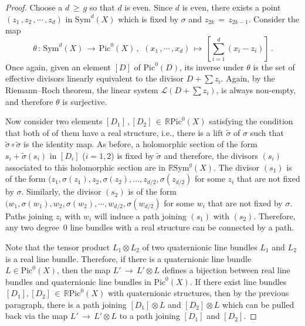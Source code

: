 \documentclass{article}
\theoremstyle{remark}
\begin{document}
\begin{proof}
  Choose a $d\,\geq\, g$ so that $d$ is even. Since $d$ is even, there exists a point
$(z_1\, ,z_2\, ,\cdots\, ,z_d)$
in $\mathrm{Sym}^d(X)$ which is fixed by $\sigma$ and $z_{2k}\,=\,z_{2k-1}$.  
   Consider the map 
   \[\theta\,:\, \mathrm{Sym}^d(X) \,\longrightarrow\, \mathrm{Pic}^0(X)
   \, ,\,\ (x_1\, ,\cdots\, ,x_d) \,\longmapsto\, [\displaystyle\sum_{i=1}^d (x_i-z_i)]\, .\]
Once again, given an element $[D]$ of  $\mathrm{Pic}^0(D)$, its inverse under $\theta$ is the set of effective divisors linearly equivalent to the divisor $D+\sum z_i$. Again, by the Riemann--Roch theorem, the linear system $\mathcal{L}(D+\sum z_i)$, is always non-empty, and therefore $\theta$ is surjective.

Now consider two elements $[D_1]\, ,[D_2]\,\in\, \mathbb{R}\mathrm{Pic}^0(X)$ satisfying
the condition that both of of them have a real structure, i.e., there is a lift
$\widetilde{\sigma}$ of 
$\sigma$ such that $\widetilde{\sigma} \circ\widetilde{\sigma}$ is the identity map. As 
before, a holomorphic section of the form $s_i+\widetilde{\sigma}(s_i)$ in $[D_i]$ 
($i=1,2$) is fixed by $\widetilde{\sigma}$ and therefore, the divisors $(s_i)$ 
associated to this holomorphic section are in $\mathbb{R}\mathrm{Sym}^{g}(X)$. The 
divisor $(s_1)$ is of the form $(z_1,\sigma(z_1),z_2,\sigma(z_2),\ldots 
,z_{d/2},\sigma(z_{d/2})$ for some $z_i$ that are not fixed by $\sigma$. Similarly, 
the divisor $(s_2)$ is of the form $(w_1,\sigma(w_1),w_2,\sigma(w_2),\cdots 
,w_{d/2},\sigma(w_{d/2})$ for some $w_i$ that are not fixed by $\sigma$. Paths 
joining $z_i$ with $w_i$ will induce a path joining $(s_1)$ with $(s_2)$. Therefore, 
any two degree~0 line bundles with a real structure can be connected by a path.

Note that the tensor product $L_1 \otimes L_2$ of two quaternionic line bundles 
$L_1$ and $L_2$ is a real line bundle. Therefore, if there is a quaternionic line 
bundle $L \in \mathrm{Pic}^0(X)$, then the map $L'\,\longrightarrow\, L'\otimes L$ defines a 
bijection between real line bundles and quaternionic line bundles in 
$\mathrm{Pic}^0(X)$.  If there exist line bundles $[D_1],[D_2]\,\in\, 
\mathbb{R}\mathrm{Pic}^0(X)$ with quaternionic structures, then by the previous 
paragraph, there is a path joining $[D_1]\otimes L$ and $[D_2]\otimes L$ which can 
be pulled back via the map $L'\,\longrightarrow\, L'\otimes L$ to a path joining $[D_1]$ and 
$[D_2]$.
\end{proof}
\end{document}
